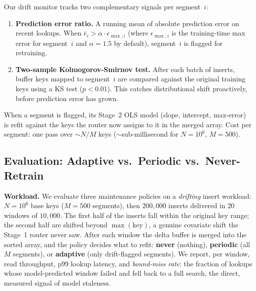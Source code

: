 \documentclass[sigconf, nonacm]{acmart}
\begin{document}
Our drift monitor tracks two complementary signals per segment~$i$:

\begin{enumerate}
    \item \textbf{Prediction error ratio.} A running mean of absolute prediction error on recent lookups. When $\bar{e}_i > \alpha \cdot \epsilon_{\max,i}$ (where $\epsilon_{\max,i}$ is the training-time max error for segment~$i$ and $\alpha = 1.5$ by default), segment~$i$ is flagged for retraining.
    \item \textbf{Two-sample Kolmogorov-Smirnov test.} After each batch of inserts, buffer keys mapped to segment~$i$ are compared against the original training keys using a KS test ($p < 0.01$). This catches distributional shift proactively, before prediction error has grown.
\end{enumerate}

When a segment is flagged, its Stage~2 OLS model (slope, intercept, max-error) is refit against the keys the router now assigns to it in the merged array. Cost per segment: one pass over $\sim N/M$ keys ($\sim$sub-millisecond for $N=10^6$, $M=500$).

\subsection{Evaluation: Adaptive vs.\ Periodic vs.\ Never-Retrain}

\noindent\textbf{Workload.} We evaluate three maintenance policies on a \textit{drifting} insert workload: $N=10^6$ base keys ($M=500$ segments), then $200{,}000$ inserts delivered in $20$ windows of $10{,}000$. The first half of the inserts fall within the original key range; the second half are shifted beyond $\max(\text{key})$, a genuine covariate shift the Stage~1 router never saw. After each window the delta buffer is merged into the sorted array, and the policy decides what to refit: \textbf{never} (nothing), \textbf{periodic} (all $M$ segments), or \textbf{adaptive} (only drift-flagged segments). We report, per window, read throughput, p99 lookup latency, and \textit{bound-miss rate}: the fraction of lookups whose model-predicted window failed and fell back to a full search, the direct, measured signal of model staleness.
\end{document}
